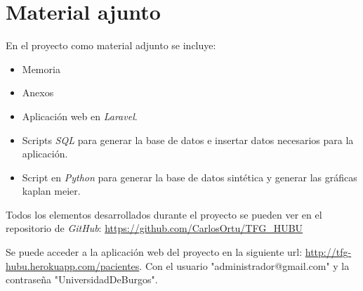 \section{Material ajunto}

En el proyecto como material adjunto se incluye: 
\begin{itemize}
	\item Memoria
	\item Anexos 
	\item Aplicación web en \textit{Laravel}.
	\item Scripts \textit{SQL} para generar la base de datos e insertar datos necesarios para la aplicación.
	\item Script en \textit{Python} para generar la base de datos sintética y generar las gráficas kaplan meier.
\end{itemize}

Todos los elementos desarrollados durante el proyecto se pueden ver en el repositorio de \textit{GitHub}: \url{https://github.com/CarlosOrtu/TFG_HUBU}

Se puede acceder a la aplicación web del proyecto en la siguiente url: \url{http://tfg-hubu.herokuapp.com/pacientes}. Con el usuario "{}administrador@gmail.com{}"{} y la contraseña "{}UniversidadDeBurgos".